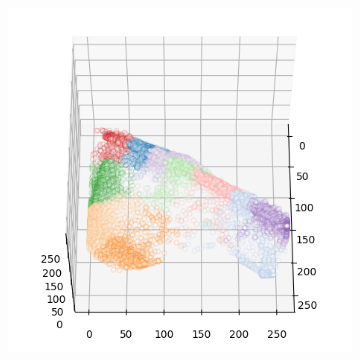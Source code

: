 \begin{figure}[htbp]
\begin{subfigure}[t]{0.32\textwidth}
    \end{subfigure}
    \begin{subfigure}[t]{0.32\textwidth}
        \includegraphics[width=\linewidth]{../../python_code/plots/kmeans/flower-6/clusters_elev60_azim0.png}
    \end{subfigure}
\end{figure}

